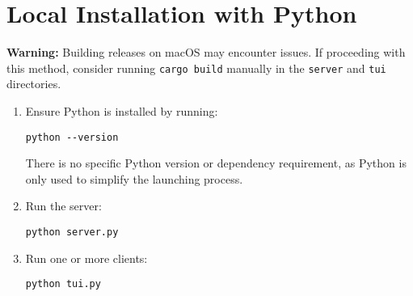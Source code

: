 \section{Local Installation with Python}

\noindent
\begin{myWarning}
\textbf{Warning:} Building releases on macOS may encounter issues. If proceeding with this method, consider running \texttt{cargo build} manually in the \texttt{server} and \texttt{tui} directories.
\end{myWarning}

\begin{enumerate}
    \item Ensure Python is installed by running:

        \begin{lstlisting}
python --version
        \end{lstlisting}

    There is no specific Python version or dependency requirement, as Python is only used to simplify the launching process.

    \item Run the server:

        \begin{lstlisting}
python server.py
        \end{lstlisting}

    \item Run one or more clients:

        \begin{lstlisting}
python tui.py
        \end{lstlisting}
\end{enumerate}

